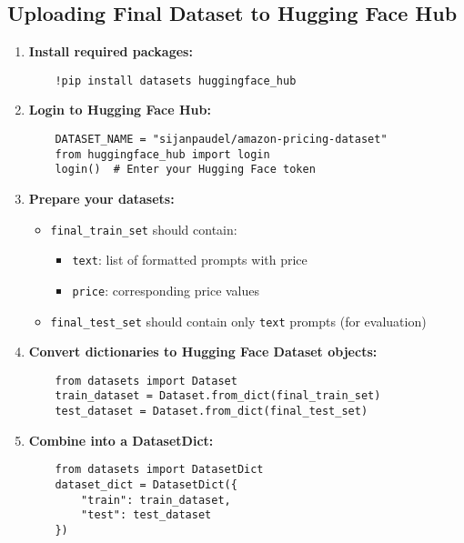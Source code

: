 \documentclass[a4paper, 12pt]{article}
\begin{document}
\subsection*{Uploading Final Dataset to Hugging Face Hub}
\begin{tcolorbox}[colback=green!5!white, colframe=green!75!black, title=Dataset Upload Guide]
\begin{enumerate}
    \item \textbf{Install required packages:}
    \begin{verbatim}
    !pip install datasets huggingface_hub
    \end{verbatim}

    \item \textbf{Login to Hugging Face Hub:}
    \begin{verbatim}
    DATASET_NAME = "sijanpaudel/amazon-pricing-dataset"
    from huggingface_hub import login
    login()  # Enter your Hugging Face token
    \end{verbatim}
    
    \item \textbf{Prepare your datasets:}
    \begin{itemize}
        \item \texttt{final\_train\_set} should contain:
        \begin{itemize}
            \item \texttt{text}: list of formatted prompts with price
            \item \texttt{price}: corresponding price values
        \end{itemize}
        \item \texttt{final\_test\_set} should contain only \texttt{text} prompts (for evaluation)
    \end{itemize}

    \item \textbf{Convert dictionaries to Hugging Face Dataset objects:}
    \begin{verbatim}
    from datasets import Dataset
    train_dataset = Dataset.from_dict(final_train_set)
    test_dataset = Dataset.from_dict(final_test_set)
    \end{verbatim}

    \item \textbf{Combine into a DatasetDict:}
    \begin{verbatim}
    from datasets import DatasetDict
    dataset_dict = DatasetDict({
        "train": train_dataset,
        "test": test_dataset
    })
    \end{verbatim}


\end{enumerate}
\end{tcolorbox}
\end{document}
